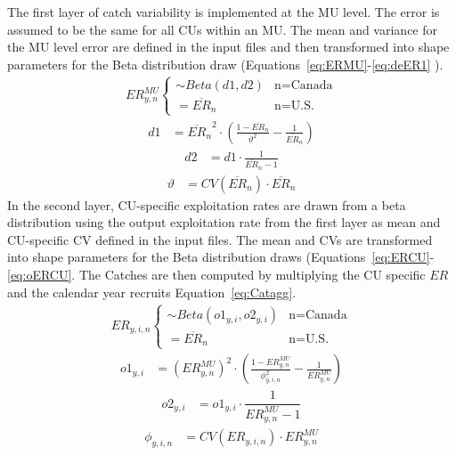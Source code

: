 \documentclass[11pt]{book}
\begin{document}
The first layer of catch variability is implemented at the MU level. The error is assumed to be the same for all CUs within an MU. The mean and variance for the MU level error are defined in the input files and then transformed into shape parameters for the Beta distribution draw (Equations~\ref{eq:ERMU}-\ref{eq:deER1} ).
\begin{align}
ER^{MU}_{y,n} 
\begin{cases}
  \sim Beta(d1,d2) & \text{n=Canada} \\
   = \overline{ER}_{n}  & \text{n=U.S.}
\end{cases}
  \label{eq:ERMU}
\end{align}
\begin{align}
\label{eq:deER1}
   d1 &= {\overline{ER}_{n}}^2 \cdot \left(\frac{1-\overline{ER}_{n}}{\vartheta^{2}}-\frac{1}{\overline{ER}_{n}}\right)  
\end{align}
\begin{align}
   d2 &= d1 \cdot \frac{1}{\overline{ER}_{n}-1}
\end{align}
\begin{align}
   \vartheta &= CV(\overline{ER}_{n}) \cdot \overline{ER}_{n}  
  \label{eq:deER}
\end{align}
In the second layer, CU-specific exploitation rates are drawn from a beta distribution using the output exploitation rate from the first layer as mean and CU-specific CV defined in the input files. The mean and CVs are transformed into shape parameters for the Beta distribution draws (Equations~\ref{eq:ERCU}-\ref{eq:oERCU}. The Catches are then computed by multiplying the CU specific \(ER\) and the calendar year recruits Equation~\ref{eq:Catagg}.
\begin{align}
ER_{y,i,n} 
\begin{cases}
 \sim Beta(o1_{y,i},o2_{y,i}) & \text{n=Canada} \\
 =\overline{ER}_{n}  & \text{n=U.S.}
\end{cases}  
  \label{eq:ERCU}
\end{align}
\begin{align}
   o1_{y,i} &= ({ER^{MU}_{y,n}})^2 \cdot \left(\frac{1-ER^{MU}_{y,n}}{\phi_{y,i,n}^{2}}-\frac{1}{ER^{MU}_{y,n}}\right)
\end{align}
\begin{align}
   o2_{y,i} &= o1_{y,i} \cdot \dfrac{1}{ER^{MU}_{y,n}-1}
\end{align}
\begin{align}
   \phi_{y,i,n} &= CV(ER_{y,i,n}) \cdot ER^{MU}_{y,n}
   \label{eq:oERCU}
\end{align}
\end{document}

